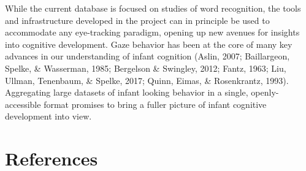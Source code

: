 \documentclass[
  english,
  man,floatsintext]{apa6}
\begin{document}
While the current database is focused on studies of word recognition, the tools and infrastructure developed in the project can in principle be used to accommodate any eye-tracking paradigm, opening up new avenues for insights into cognitive development.
Gaze behavior has been at the core of many key advances in our understanding of infant cognition (Aslin, 2007; Baillargeon, Spelke, \& Wasserman, 1985; Bergelson \& Swingley, 2012; Fantz, 1963; Liu, Ullman, Tenenbaum, \& Spelke, 2017; Quinn, Eimas, \& Rosenkrantz, 1993).
Aggregating large datasets of infant looking behavior in a single, openly-accessible format promises to bring a fuller picture of infant cognitive development into view.

\newpage

\hypertarget{references}{%
\section{References}\label{references}}

\begingroup
\setlength{\parindent}{-0.5in}
\setlength{\leftskip}{0.5in}
\end{document}
